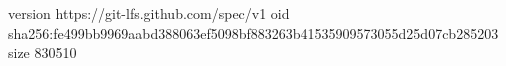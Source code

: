 version https://git-lfs.github.com/spec/v1
oid sha256:fe499bb9969aabd388063ef5098bf883263b41535909573055d25d07cb285203
size 830510
